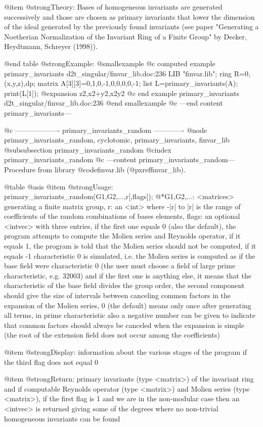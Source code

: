 @item @strong{Theory:}
Bases of homogeneous invariants are generated successively and those
are chosen as primary invariants that lower the dimension of the ideal
generated by the previously found invariants (see paper "Generating a
Noetherian Normalization of the Invariant Ring of a Finite Group" by
Decker, Heydtmann, Schreyer (1998)).

@end table
@strong{Example:}
@smallexample
@c computed example primary_invariants d2t_singular/finvar_lib.doc:236 
LIB "finvar.lib";
ring R=0,(x,y,z),dp;
matrix A[3][3]=0,1,0,-1,0,0,0,0,-1;
list L=primary_invariants(A);
print(L[1]);
@expansion{} z2,x2+y2,x2y2
@c end example primary_invariants d2t_singular/finvar_lib.doc:236
@end smallexample
@c ---end content primary_invariants---

@c ------------------- primary_invariants_random -------------
@node primary_invariants_random, cyclotomic, primary_invariants, finvar_lib
@subsubsection primary_invariants_random
@cindex primary_invariants_random
@c ---content primary_invariants_random---
Procedure from library @code{finvar.lib} (@pxref{finvar_lib}).

@table @asis
@item @strong{Usage:}
primary_invariants_random(G1,G2,...,r[,flags]);
@*G1,G2,...: <matrices> generating a finite matrix group, r: an <int>
where -|r| to |r| is the range of coefficients of the random
combinations of bases elements, flags: an optional <intvec> with three
entries, if the first one equals 0 (also the default), the program
attempts to compute the Molien series and Reynolds operator, if it
equals 1, the program is told that the Molien series should not be
computed, if it equals -1 characteristic 0 is simulated, i.e. the
Molien series is computed as if the base field were characteristic 0
(the user must choose a field of large prime characteristic, e.g.
32003) and if the first one is anything else, it means that the
characteristic of the base field divides the group order, the second
component should give the size of intervals between canceling common
factors in the expansion of the Molien series, 0 (the default) means
only once after generating all terms, in prime characteristic also a
negative number can be given to indicate that common factors should
always be canceled when the expansion is simple (the root of the
extension field does not occur among the coefficients)

@item @strong{Display:}
information about the various stages of the program if the third
flag does not equal 0

@item @strong{Return:}
primary invariants (type <matrix>) of the invariant ring and if
computable Reynolds operator (type <matrix>) and Molien series (type
<matrix>), if the first flag is 1 and we are in the non-modular case
then an <intvec> is returned giving some of the degrees where no
non-trivial homogeneous invariants can be found

